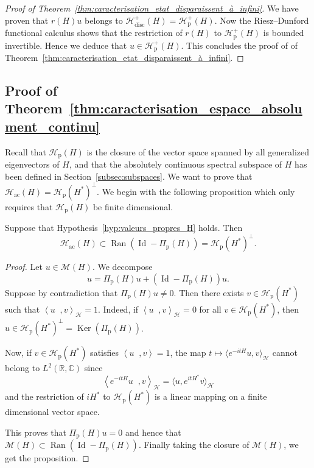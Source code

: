 \documentclass[AHL,Unicode,longabstracts,published]{cedram}
\newcommand{\Hi}{\mathcal{H}}
\newcommand{\bbC}{\mathbb{C}}
\newcommand{\R}{\mathbb{R}}
\newcommand{\rmp}{\mathrm{p}}
\newcommand{\acr}{\mathrm{ac}}
\newcommand{\disc}{\mathrm{disc}}
\newcommand{\scal}[2]{\left\langle{#1} \middle., {#2}\right\rangle}
\DeclareMathOperator{\Ran}{Ran}
\DeclareMathOperator{\Ker}{Ker}
\DeclareMathOperator{\Id}{Id}
\newcommand*\bbC{\mathbb{C}}
\newcommand{\Hi}{\mathcal{H}}
\newcommand{\rmp}{\mathrm{p}}
\newcommand{\R}{\mathbb{R}}
\newcommand{\acr}{\mathrm{ac}}
\begin{document}
\begin{proof}[Proof of Theorem~\ref{thm:caracterisation_etat_disparaissent_à_infini}]
We have proven that $r(H) u$ belongs to $\Hi_{\disc}^+(H)=\Hi_{\rmp}^+(H)$. Now the Riesz--Dunford functional calculus shows that the restriction of $r(H)$ to $\Hi_{\rmp}^+(H)$ is bounded invertible. Hence we deduce that $u\in\Hi_{\rmp}^+(H)$. This concludes the proof of of Theorem~\ref{thm:caracterisation_etat_disparaissent_à_infini}.
\end{proof}


\subsection{Proof of Theorem~\ref{thm:caracterisation_espace_absolument_continu}}\label{subsec:abs_cont}

Recall that $\Hi_{\rmp}(H)$ is the closure of the vector space spanned by all generalized eigenvectors of $H$, and that the absolutely continuous spectral subspace of $H$ has been defined in Section~\ref{subsec:subspaces}. We want to prove that $\Hi_\acr(H)=\Hi_\rmp(H^*)^\perp$. We begin with the following proposition which only requires that $\Hi_\rmp(H)$ be finite dimensional.

\begin{prop}\label{prop:easy_incl_ac}
Suppose that Hypothesis~\ref{hyp:valeurs_propres_H} holds. Then
\begin{equation*}
\Hi_\acr(H)\subset\Ran(\Id-\Pi_\rmp(H))=\Hi_\rmp(H^*)^\perp.
\end{equation*}
\end{prop}


\begin{proof}
Let $u\in\mathcal{M}(H)$. We decompose
\begin{equation*}
u=\Pi_\rmp(H)u+(\Id-\Pi_\rmp(H))u.
\end{equation*}
Suppose by contradiction that $\Pi_\rmp(H) u\neq 0$. Then there exists $v\in\Hi_\rmp(H^*)$ such that $\scal{u}{v}_\Hi=1$. Indeed, if $\scal{u}{v}_\Hi=0$ for all $v\in\Hi_\rmp(H^*)$, then $u\in\Hi_\rmp(H^*)^\perp=\Ker(\Pi_\rmp(H))$.

Now, if $v\in\Hi_\rmp(H^*)$ satisfies $\scal{u}{v}=1$, the map $t\mapsto\langle e^{-itH}u, v\rangle_\Hi$ cannot belong to $L^2(\R,\bbC)$ since
\begin{equation*}
\scal{e^{-itH}u}{v}_\Hi=\big \langle u,e^{itH^*}v \big\rangle_\Hi
\end{equation*}
and the restriction of $iH^*$ to $\Hi_\rmp(H^*)$ is a linear mapping on a finite dimensional vector space.

This proves that $\Pi_\rmp(H) u=0$ and hence that $\mathcal{M}(H)\subset\Ran(\Id-\Pi_\rmp(H))$. Finally taking the closure of $\mathcal{M}(H)$, we get the proposition.
\end{proof}
\end{document}
